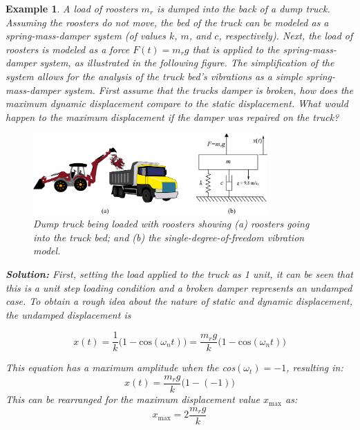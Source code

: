 \documentclass[12pt,letter]{article}
\newtheorem{ex}{Example}
\numberwithin{ex}{section} %
\newenvironment{example}{\begin{mdframed}[middlelinewidth=0.5mm]\begin{ex}\normalfont}{\end{ex}\end{mdframed}}
\numberwithin{re}{section} %
\begin{document}
\begin{example}
A load of roosters $m_r$ is dumped into the back of a dump truck. Assuming the roosters do not move, the bed of the truck can be modeled as a spring-mass-damper system (of values $k$, $m$, and $c$, respectively). Next, the load of roosters is modeled as a force $F(t) = m_r g$ that is applied to the spring-mass-damper system, as illustrated in the following figure. The simplification of the system allows for the analysis of the truck bed's vibrations as a simple spring-mass-damper system. First assume that the trucks damper is broken, how does the maximum dynamic displacement compare to the static displacement. What would happen to the maximum displacement if the damper was repaired on the truck? %

\begin{figure}[H]
	\centering
	\includegraphics[width=0.8\textwidth]{../Figures/dump_truck_example.png}
	\caption{Dump truck being loaded with roosters showing (a) roosters going into the truck bed; and (b) the single-degree-of-freedom vibration model.}
\end{figure}

\noindent\textbf{Solution:} First, setting the load applied to the truck as 1 unit, it can be seen that this is a unit step loading condition and a broken damper represents an undamped case. To obtain a rough idea about the nature of static and dynamic displacement, the undamped displacement is

\begin{equation}
	x(t) = \frac{1}{k}\big(1-\text{cos}(\omega_n t)\big) = \frac{m_rg}{k}\big(1-\text{cos}(\omega_n t)\big)
\end{equation}
 
This equation has a maximum amplitude when the cos$(\omega_t)=-1$, resulting in:
\begin{equation}
	x(t) = \frac{m_rg}{k}\big(1-(-1)\big)
\end{equation}
This can be rearranged for the maximum displacement value $x_\text{max} $ as:
\begin{equation}
	x_\text{max} = 2\frac{m_rg}{k}
\end{equation} 


\end{example}
\end{document}
